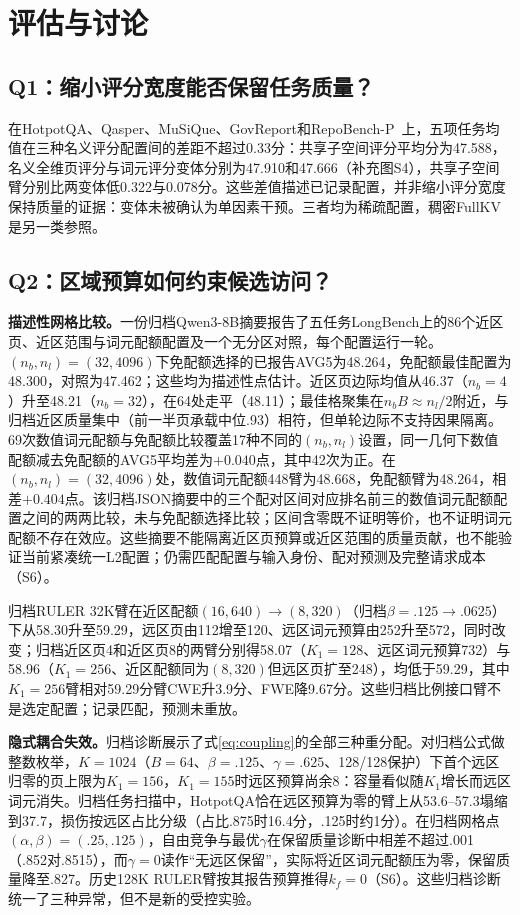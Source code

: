 \documentclass[conference,9pt,letterpaper]{IEEEtran}
\begin{document}
\section{评估与讨论}
\subsection{Q1：缩小评分宽度能否保留任务质量？}
在HotpotQA、Qasper、MuSiQue、GovReport和RepoBench-P~\cite{longbench}上，五项任务均值在三种名义评分配置间的差距不超过0.33分：共享子空间评分平均分为47.588，名义全维页评分与词元评分变体分别为47.910和47.666（补充图S4），共享子空间臂分别比两变体低0.322与0.078分。这些差值描述已记录配置，并非缩小评分宽度保持质量的证据：变体未被确认为单因素干预。三者均为稀疏配置，稠密FullKV是另一类参照。

\subsection{Q2：区域预算如何约束候选访问？}
\textbf{描述性网格比较。}一份归档Qwen3-8B摘要报告了五任务LongBench上的86个近区页、近区范围与词元配额配置及一个无分区对照，每个配置运行一轮。$(n_b,n_l)=(32,4096)$下免配额选择的已报告AVG5为48.264，免配额最佳配置为48.300，对照为47.462；这些均为描述性点估计。近区页边际均值从46.37（$n_b{=}4$）升至48.21（$n_b{=}32$），在64处走平（48.11）；最佳格聚集在$n_bB\approx n_l/2$附近，与归档近区质量集中（前一半页承载中位.93）相符，但单轮边际不支持因果隔离。69次数值词元配额与免配额比较覆盖17种不同的$(n_b,n_l)$设置，同一几何下数值配额减去免配额的AVG5平均差为$+0.040$点，其中42次为正。在$(n_b,n_l)=(32,4096)$处，数值词元配额448臂为48.668，免配额臂为48.264，相差$+0.404$点。该归档JSON摘要中的三个配对区间对应排名前三的数值词元配额配置之间的两两比较，未与免配额选择比较；区间含零既不证明等价，也不证明词元配额不存在效应。这些摘要不能隔离近区页预算或近区范围的质量贡献，也不能验证当前紧凑统一L2配置；仍需匹配配置与输入身份、配对预测及完整请求成本（S6）。

归档RULER 32K臂在近区配额$(16,640)\rightarrow(8,320)$（归档$\beta=.125\!\rightarrow\!.0625$）下从58.30升至59.29，远区页由112增至120、远区词元预算由252升至572，同时改变；归档近区页4和近区页8的两臂分别得58.07（$K_1=128$、远区词元预算732）与58.96（$K_1=256$、近区配额同为$(8,320)$但远区页扩至248），均低于59.29，其中$K_1=256$臂相对59.29分臂CWE升3.9分、FWE降9.67分。这些归档比例接口臂不是选定配置；记录匹配，预测未重放。

\textbf{隐式耦合失效。}归档诊断展示了式\eqref{eq:coupling}的全部三种重分配。对归档公式做整数枚举，$K=1024$（$B=64$、$\beta=.125$、$\gamma=.625$、128/128保护）下首个远区归零的页上限为$K_1=156$，$K_1=155$时远区预算尚余8：容量看似随$K_1$增长而远区词元消失。归档任务扫描中，HotpotQA恰在远区预算为零的臂上从53.6--57.3塌缩到37.7，损伤按远区占比分级（占比.875时16.4分，.125时约1分）。在归档网格点$(\alpha,\beta)=(.25,.125)$，自由竞争与最优$\gamma$在保留质量诊断中相差不超过.001（.852对.8515），而$\gamma=0$读作“无远区保留”，实际将近区词元配额压为零，保留质量降至.827。历史128K RULER臂按其报告预算推得$k_f=0$（S6）。这些归档诊断统一了三种异常，但不是新的受控实验。
\end{document}

